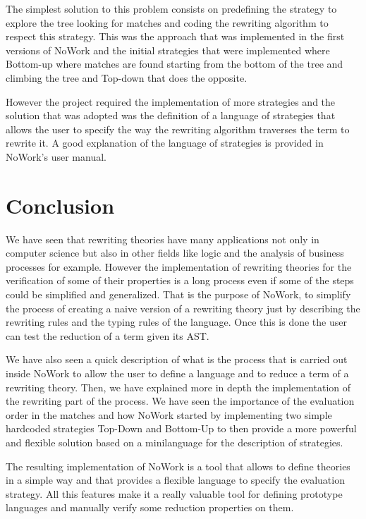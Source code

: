\documentclass[12pt,a4paper]{article}
\begin{document}
The simplest solution to this problem consists on predefining the
strategy to explore the tree looking for matches and coding the
rewriting algorithm to respect this strategy. This was the approach
that was implemented in the first versions of NoWork and the initial
strategies that were implemented where Bottom-up where matches are
found starting from the bottom of the tree and climbing the tree and
Top-down that does the opposite.

However the project required the implementation of more
strategies and the solution that was adopted was the definition of a
language of strategies that allows the user to specify the way the
rewriting algorithm traverses the term to rewrite it. A good
explanation of the language of strategies is provided in NoWork's user
manual. 
\section{Conclusion}

We have seen that rewriting theories have many applications not
only in computer science but also in other fields like logic and the
analysis of business processes for example. However the implementation
of rewriting theories for the verification of some of their
properties is a long process even if some of the steps could be
simplified and generalized. That is the purpose of NoWork, to simplify
the process of creating a naive version of a rewriting theory just
by describing the rewriting rules and the typing rules of the
language. Once this is done the user can test the reduction of a term
given its AST.


We have also seen a quick description of what is the process that is
carried out inside NoWork to allow the user to define a language and
to reduce a term of a rewriting theory. Then, we have explained more in depth the
implementation of the rewriting part of the process. We have
seen the importance of the evaluation order in the matches and how
NoWork started by implementing two simple hardcoded strategies
Top-Down and Bottom-Up to then provide a more powerful and flexible
solution based on a minilanguage for the description of strategies.

The resulting implementation of NoWork is a tool that allows to
define theories in a simple way and that provides a flexible language
to specify the evaluation strategy. All this features make it 
a really valuable tool for defining prototype languages
and manually verify some reduction properties on them.
\end{document}
